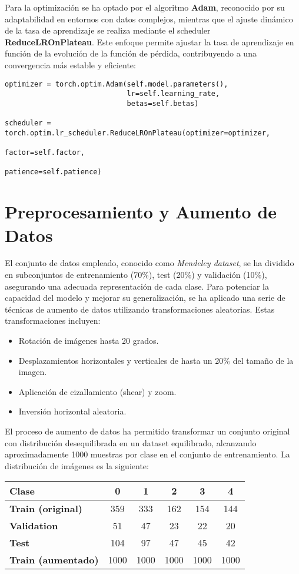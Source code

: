 \documentclass[11pt,spanish,listoffigures,listoftables]{tfgetsinf}
\begin{document}
Para la optimización se ha optado por el algoritmo \textbf{Adam}, reconocido por su adaptabilidad en entornos con datos complejos, mientras que el ajuste dinámico de la tasa de aprendizaje se realiza mediante el scheduler \textbf{ReduceLROnPlateau}. Este enfoque permite ajustar la tasa de aprendizaje en función de la evolución de la función de pérdida, contribuyendo a una convergencia más estable y eficiente:

\begin{verbatim}
optimizer = torch.optim.Adam(self.model.parameters(),
                             lr=self.learning_rate,
                             betas=self.betas)

scheduler = torch.optim.lr_scheduler.ReduceLROnPlateau(optimizer=optimizer,
                                                       factor=self.factor,
                                                       patience=self.patience)
\end{verbatim}

\section{Preprocesamiento y Aumento de Datos}
El conjunto de datos empleado, conocido como \textit{Mendeley dataset}\cite{gornale2020digital}, se ha dividido en subconjuntos de entrenamiento (70\%), test (20\%) y validación (10\%), asegurando una adecuada representación de cada clase. Para potenciar la capacidad del modelo y mejorar su generalización, se ha aplicado una serie de técnicas de aumento de datos utilizando transformaciones aleatorias. Estas transformaciones incluyen:
\begin{itemize}
    \item Rotación de imágenes hasta 20 grados.
    \item Desplazamientos horizontales y verticales de hasta un 20\% del tamaño de la imagen.
    \item Aplicación de cizallamiento (shear) y zoom.
    \item Inversión horizontal aleatoria.
\end{itemize}

El proceso de aumento de datos ha permitido transformar un conjunto original con distribución desequilibrada en un dataset equilibrado, alcanzando aproximadamente 1000 muestras por clase en el conjunto de entrenamiento. La distribución de imágenes es la siguiente:

\begin{center}
\begin{tabular}{lccccc}
\textbf{Clase} & 0 & 1 & 2 & 3 & 4 \\
\hline
\textbf{Train (original)} & 359 & 333 & 162 & 154 & 144 \\
\textbf{Validation} & 51 & 47 & 23 & 22 & 20 \\
\textbf{Test} & 104 & 97 & 47 & 45 & 42 \\
\hline
\textbf{Train (aumentado)} & 1000 & 1000 & 1000 & 1000 & 1000 \\
\end{tabular}
\end{center}
\end{document}

